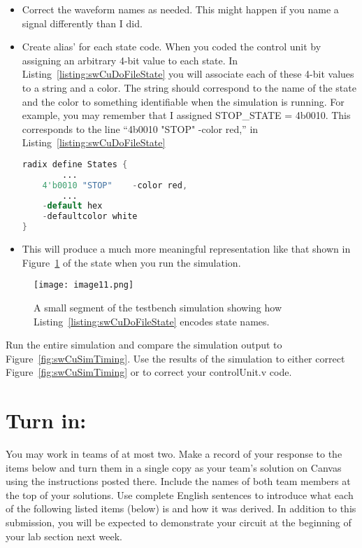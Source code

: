 \begin{itemize}
\item
  Correct the waveform names as needed. This might happen if you name a
  signal differently than I did.
\item
  Create alias' for each state code. When you coded the control unit by
  assigning an arbitrary 4-bit value to each state. In Listing~\ref{listing:swCuDoFileState} you
  will associate each of these 4-bit values to a string and a color. The
  string should correspond to the name of the state and the color to
  something identifiable when the simulation is running. For example,
  you may remember that I assigned STOP\_STATE =
  4\textquotesingle b0010. This corresponds to the line
  ``4\textquotesingle b0010 "STOP" -color red,'' in Listing~\ref{listing:swCuDoFileState}
  
  
  \begin{lstlisting}[language=Verilog,
 caption={Creating alias' for the binary codes of states in the do file uses requires knowing the binary code of each state, the name of each state and the color for each state.},
 label={listing:swCuDoFileState},
 frame=single]
 radix define States {
		...
	4'b0010 "STOP"    -color red,
		...
	-default hex
	-defaultcolor white
}
 \end{lstlisting}
  
\item
  This will produce a much more meaningful representation like that
  shown in Figure~\ref{fig:swCuTestbenchTiming} of the state when you run the simulation.
\end{itemize}

\begin{figure}[ht]
\texttt{[image: image11.png]}
\caption{A small segment of the testbench simulation showing how
Listing~\ref{listing:swCuDoFileState} encodes state names.}
\label{fig:swCuTestbenchTiming}
\end{figure}

Run the entire simulation and compare the simulation output to Figure~\ref{fig:swCuSimTiming}. 
Use the results of the simulation to either correct Figure~\ref{fig:swCuSimTiming} or 
to correct your controlUnit.v code.

\section{Turn in:}

You may work in teams of at most two. Make a record of your response to
the items below and turn them in a single copy as your team's solution
on Canvas using the instructions posted there. Include the names of both
team members at the top of your solutions. Use complete English
sentences to introduce what each of the following listed items (below)
is and how it was derived. In addition to this submission, you will be
expected to demonstrate your circuit at the beginning of your lab
section next week.

